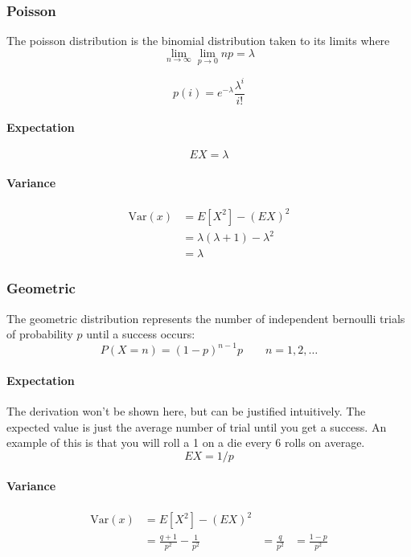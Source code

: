 \subsubsection{Poisson}
The poisson distribution is the binomial distribution taken to its limits where 
$$\lim_{n \to \infty} \lim_{p \to 0} np = \lambda$$

$$p(i) = e^{-\lambda} \frac{\lambda^i}{i!}$$

\paragraph{Expectation}
$$EX = \lambda$$

\paragraph{Variance}
    \begin{equation*}
    \begin{aligned}
        \text{Var}(x) &= E[X^2] - (EX)^2 \\
                      &= \lambda (\lambda+1) - \lambda^2 \\
                      &= \lambda
    \end{aligned}
    \end{equation*}

\subsubsection{Geometric}
The geometric distribution represents the number of independent bernoulli trials of probability $p$ until a success occurs:
$$P(X=n) = (1-p)^{n-1}p \qquad n=1,2,\dots$$

\paragraph{Expectation}
The derivation won't be shown here, but  can be justified intuitively. The expected value is just the average number of trial until you get a success. An example of this is that you will roll a 1 on a die every 6 rolls on average.
$$EX = 1/p$$

\paragraph{Variance}
    \begin{equation*}
    \begin{aligned}
        \text{Var}(x) &= E[X^2] - (EX)^2 \\
                      &= \frac{q+1}{p^2}-\frac{1}{p^2} 
                      &= \frac{q}{p^2}
                      &=\frac{1-p}{p^2}
    \end{aligned}
    \end{equation*}

